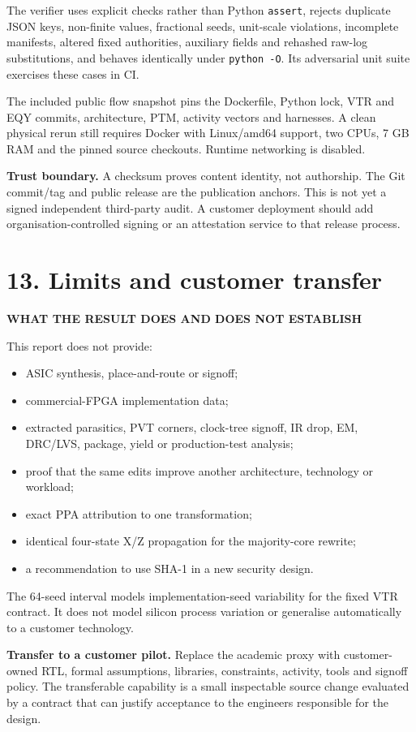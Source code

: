 \documentclass[10pt,a4paper]{article}
\newcommand{\smallcaps}[1]{\textcolor{Mid}{\fontsize{8.5}{10}\selectfont\bfseries\MakeUppercase{#1}}}
\newcommand{\newpageheading}[2]{\clearpage\section{#1}\smallcaps{#2}\vspace{6pt}}
\begin{document}
The verifier uses explicit checks rather than Python \texttt{assert}, rejects duplicate JSON keys, non-finite values, fractional seeds, unit-scale violations, incomplete manifests, altered fixed authorities, auxiliary fields and rehashed raw-log substitutions, and behaves identically under \texttt{python -O}. Its adversarial unit suite exercises these cases in CI.

The included public flow snapshot pins the Dockerfile, Python lock, VTR and EQY commits, architecture, PTM, activity vectors and harnesses. A clean physical rerun still requires Docker with Linux/amd64 support, two CPUs, 7 GB RAM and the pinned source checkouts. Runtime networking is disabled.

\begin{scopebox}
\textbf{Trust boundary.} A checksum proves content identity, not authorship. The Git commit/tag and public release are the publication anchors. This is not yet a signed independent third-party audit. A customer deployment should add organisation-controlled signing or an attestation service to that release process.
\end{scopebox}

\newpageheading{13. Limits and customer transfer}{What the result does and does not establish}

This report does not provide:
\begin{itemize}
  \item ASIC synthesis, place-and-route or signoff;
  \item commercial-FPGA implementation data;
  \item extracted parasitics, PVT corners, clock-tree signoff, IR drop, EM, DRC/LVS, package, yield or production-test analysis;
  \item proof that the same edits improve another architecture, technology or workload;
  \item exact PPA attribution to one transformation;
  \item identical four-state X/Z propagation for the majority-core rewrite;
  \item a recommendation to use SHA-1 in a new security design.
\end{itemize}

The 64-seed interval models implementation-seed variability for the fixed VTR contract. It does not model silicon process variation or generalise automatically to a customer technology.

\begin{claimbox}
\textbf{Transfer to a customer pilot.} Replace the academic proxy with customer-owned RTL, formal assumptions, libraries, constraints, activity, tools and signoff policy. The transferable capability is a small inspectable source change evaluated by a contract that can justify acceptance to the engineers responsible for the design.
\end{claimbox}
\end{document}
